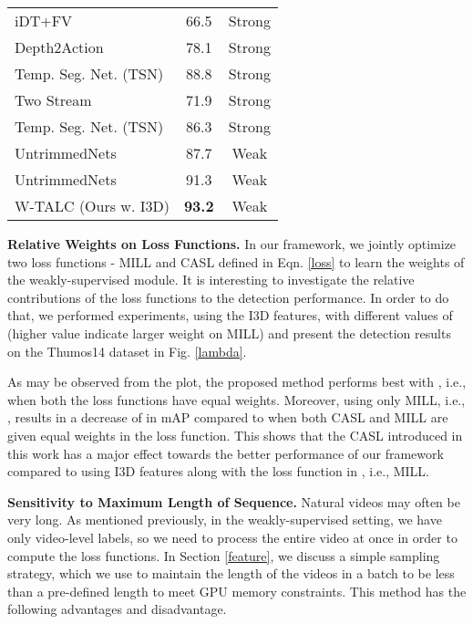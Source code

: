 \documentclass[runningheads]{llncs}
\begin{document}
\begin{table}[t!]
\begin{minipage}{0.48\textwidth}
\begin{tabular}{l | c | c}
{iDT+FV \cite{wang2013action}} & {66.5} & {Strong }\\
{Depth2Action \cite{jain201515}} & {78.1} & {Strong }\\
{Temp. Seg. Net. (TSN) \cite{wang2016temporal}} & {88.8} & {Strong }\\
{Two Stream  \cite{simonyan2014two}} & {71.9} & {Strong }\\
{Temp. Seg. Net. (TSN) \cite{wang2016temporal}} & {86.3} & {Strong}\\		
			\hline
			\hline
			{UntrimmedNets \cite{wang2017untrimmednets}} & {87.7} & {Weak}\\
{UntrimmedNets \cite{wang2017untrimmednets}} & {91.3} & {Weak }\\
{W-TALC (Ours w. I3D)} & {\textbf{93.2}} & {Weak}\\
			\hline
			\hline
		\end{tabular}
		\label{activitynet_classification}
	\end{minipage}
\end{table}

\textbf{Relative Weights on Loss Functions.} In our framework, we jointly optimize two loss functions - MILL and CASL defined in Eqn. \ref{loss} to learn the weights of the weakly-supervised module. It is interesting to investigate the relative contributions of the loss functions to the detection performance. In order to do that, we performed experiments, using the I3D features, with different values of  (higher value indicate larger weight on MILL) and present the detection results on the Thumos14 dataset in Fig. \ref{lambda}. 

As may be observed from the plot, the proposed method performs best with , i.e., when both the loss functions have equal weights. Moreover, using only MILL, i.e., , results in a decrease of  in mAP compared to when both CASL and MILL are given equal weights in the loss function. This shows that the CASL introduced in this work has a major effect towards the better performance of our framework compared to using I3D features along with the loss function in \cite{wang2017untrimmednets}, i.e., MILL.

\textbf{Sensitivity to Maximum Length of Sequence.}
Natural videos may often be very long. As mentioned previously, in the weakly-supervised setting, we have only video-level labels, so we need to process the entire video at once in order to compute the loss functions. In Section \ref{feature}, we discuss a simple sampling strategy, which we use to maintain the length of the videos in a batch to be less than a pre-defined length  to meet GPU memory constraints. This method has the following advantages and disadvantage. 
\end{document}
